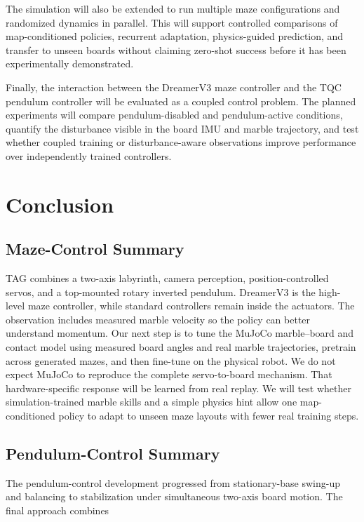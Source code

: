\documentclass[9pt]{extarticle}
\begin{document}
The simulation will also be extended to run multiple maze configurations and randomized dynamics in parallel. This will support controlled comparisons of map-conditioned policies, recurrent adaptation, physics-guided prediction, and transfer to unseen boards without claiming zero-shot success before it has been experimentally demonstrated.

Finally, the interaction between the DreamerV3 maze controller and the TQC pendulum controller will be evaluated as a coupled control problem. The planned experiments will compare pendulum-disabled and pendulum-active conditions, quantify the disturbance visible in the board IMU and marble trajectory, and test whether coupled training or disturbance-aware observations improve performance over independently trained controllers.

\section{Conclusion}

\subsection{Maze-Control Summary}

TAG combines a two-axis labyrinth, camera perception, position-controlled servos, and a top-mounted rotary inverted pendulum. DreamerV3 is the high-level maze controller, while standard controllers remain inside the actuators. The observation includes measured marble velocity so the policy can better understand momentum. Our next step is to tune the MuJoCo marble--board and contact model using measured board angles and real marble trajectories, pretrain across generated mazes, and then fine-tune on the physical robot. We do not expect MuJoCo to reproduce the complete servo-to-board mechanism. That hardware-specific response will be learned from real replay. We will test whether simulation-trained marble skills and a simple physics hint allow one map-conditioned policy to adapt to unseen maze layouts with fewer real training steps.

\subsection{Pendulum-Control Summary}

The pendulum-control development progressed from stationary-base swing-up
and balancing to stabilization under simultaneous two-axis board motion.
The final approach combines
\end{document}
